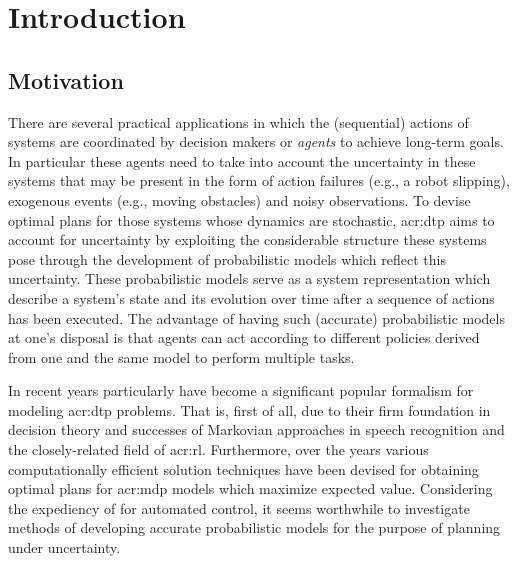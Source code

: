 \chapter{Introduction}
\label{ch:introduction}

% 

\section{Motivation}
\label{sec:motivation}

There are several practical applications in which the (sequential) actions of systems are coordinated by decision makers or \textit{agents} to achieve long-term goals.
In particular these agents need to take into account the uncertainty in these systems that may be present in the form of action failures (e.g., a robot slipping), exogenous events (e.g., moving obstacles) and noisy observations.
To devise optimal plans for those systems whose dynamics are stochastic, \acrlong{acr:dtp} aims to account for uncertainty by exploiting the considerable structure these systems pose through the development of probabilistic models which reflect this uncertainty.
These probabilistic models serve as a system representation which describe a system's state and its evolution over time after a sequence of actions has been executed.
The advantage of having such (accurate) probabilistic models at one's disposal is that agents can act according to different policies derived from one and the same model to perform multiple tasks.

In recent years particularly  have become a significant popular formalism for modeling \acrshort{acr:dtp} problems. 
That is, first of all, due to their firm foundation in decision theory and successes of Markovian approaches in speech recognition and the closely-related field of \acrfull{acr:rl}.
Furthermore, over the years various computationally efficient solution techniques have been devised for obtaining optimal plans for \acrshort{acr:mdp} models which maximize expected value.
Considering the expediency of  for automated control, it seems worthwhile to investigate methods of developing accurate probabilistic models for the purpose of planning under uncertainty.




